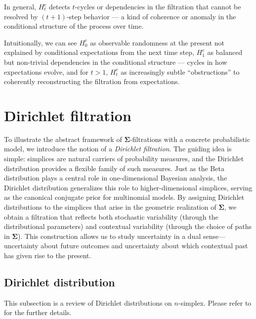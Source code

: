 \documentclass[12pt, a4paper]{amsart}
\theoremstyle{plain}
\theoremstyle{definition}
\numberwithin{figure}{section}
\numberwithin{table}{section}
\numberwithin{equation}{section}
\newcommand{\bSigma}{\mathbf{\Sigma}}
\begin{document}
In general,
$H^c_t$
detects $t$-cycles or dependencies in the filtration 
that cannot be resolved by $(t+1)$-step behavior 
— a kind of coherence or anomaly in the conditional structure of the process over time.

Intuitionally, 
we can see
$H^c_0$
as
observable randomness at the present 
not explained by conditional expectations from the next time step,
$H^c_1$
as
balanced but non-trivial dependencies in the conditional structure 
— cycles in how expectations evolve,
and
for $t > 1$,
$H^c_t$
as
increasingly subtle “obstructions” 
to coherently reconstructing the filtration from expectations.




\section{Dirichlet filtration}
\label{sec:DirichletFilt}

To illustrate the abstract framework of 
$\bSigma$-filtrations with a concrete probabilistic model, 
we introduce the notion of a \emph{Dirichlet filtration}. 
The guiding idea is simple: 
simplices are natural carriers of probability measures, 
and the Dirichlet distribution provides a flexible family of such measures. 
Just as the Beta distribution plays a central role in one-dimensional Bayesian analysis, 
the Dirichlet distribution generalizes this role to higher-dimensional simplices, 
serving as the canonical conjugate prior for multinomial models. 
By assigning Dirichlet distributions to the simplices 
that arise in the geometric realization of 
$\bSigma$, 
we obtain a filtration that reflects both stochastic variability (through the distributional parameters) 
and contextual variability 
(through the choice of paths in $\bSigma$). 
This construction allows us to study uncertainty in a dual sense—uncertainty 
about future outcomes and 
uncertainty about which contextual past has given rise to the present.




\subsection{Dirichlet distribution}
\label{sec:DirichletDist}



This subsection is a review of
Dirichlet distributions on $n$-simplex.
Please refer to
\cite{ferguson_1973}
for the further details.
\end{document}
